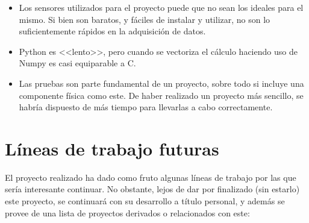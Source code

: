 \begin{itemize}
\item Los sensores utilizados para el proyecto puede que no sean los ideales para el mismo. Si bien son baratos, y fáciles de instalar y utilizar, no son lo suficientemente rápidos en la adquisición de datos. 
\item Python es <<lento>>, pero cuando se vectoriza el cálculo haciendo uso de Numpy es casi equiparable a C.
\item Las pruebas son parte fundamental de un proyecto, sobre todo si incluye una componente física como este. De haber realizado un proyecto más sencillo, se habría dispuesto de más tiempo para llevarlas a cabo correctamente. 
\end{itemize}

\section{Líneas de trabajo futuras}

El proyecto realizado ha dado como fruto algunas líneas de trabajo por las que sería interesante continuar. No obstante, lejos de dar por finalizado (sin estarlo) este proyecto, se continuará con su desarrollo a título personal, y además se provee de una lista de proyectos derivados o relacionados con este: 


